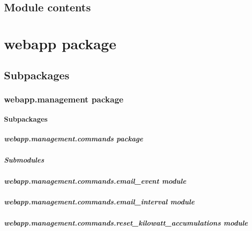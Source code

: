 \documentclass[letterpaper,10pt,english]{sphinxmanual}
\begin{document}
\subsection{Module contents}
\label{modules/microdata:module-contents}\label{modules/microdata:module-microdata}

\section{webapp package}
\label{modules/webapp::doc}\label{modules/webapp:webapp-package}

\subsection{Subpackages}
\label{modules/webapp:subpackages}

\subsubsection{webapp.management package}
\label{modules/webapp.management::doc}\label{modules/webapp.management:webapp-management-package}

\paragraph{Subpackages}
\label{modules/webapp.management:subpackages}

\subparagraph{webapp.management.commands package}
\label{modules/webapp.management.commands::doc}\label{modules/webapp.management.commands:webapp-management-commands-package}

\subparagraph{Submodules}
\label{modules/webapp.management.commands:submodules}

\subparagraph{webapp.management.commands.email\_event module}
\label{modules/webapp.management.commands:webapp-management-commands-email-event-module}

\subparagraph{webapp.management.commands.email\_interval module}
\label{modules/webapp.management.commands:webapp-management-commands-email-interval-module}

\subparagraph{webapp.management.commands.reset\_kilowatt\_accumulations module}
\label{modules/webapp.management.commands:module-webapp.management.commands.reset_kilowatt_accumulations}\label{modules/webapp.management.commands:webapp-management-commands-reset-kilowatt-accumulations-module}
\end{document}
